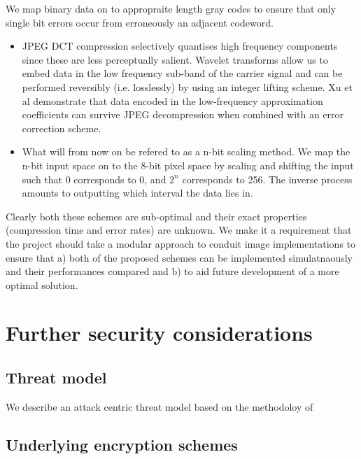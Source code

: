 We map binary data on to appropraite length gray codes to ensure that only single bit errors occur from erroneously an adjacent codeword.

\begin{itemize}

    \item JPEG DCT compression selectively quantises high frequency components since these are less perceptually salient. Wavelet transforms allow us to embed data in the low frequency sub-band of the carrier signal and can be performed reversibly (i.e. losslessly) by using an integer lifting scheme. Xu et al demonstrate that \cite{haar} data encoded in the low-frequency approximation coefficients can survive JPEG decompression when combined with an error correction scheme.
    
    \item What will from now on be refered to as a n-bit scaling method. We map the n-bit input space on to the 8-bit pixel space by scaling and shifting the input such that 0 corresponds to 0, and $2^n$ corresponds to 256. The inverse process amounts to outputting which interval the data lies in.

\end{itemize}

Clearly both these schemes are sub-optimal and their exact properties (compression time and error rates) are unknown. We make it a requirement that the project should take a modular approach to conduit image implementations to ensure that a) both of the proposed schemes can be implemented simulatnaously and their performances compared and b) to aid future development of a more optimal solution.



\FloatBarrier 
\section{Further security considerations}


\FloatBarrier
\subsection{Threat model}

We describe an attack centric threat model based on the methodoloy of \cite{XXX}



\FloatBarrier
\subsection{Underlying encryption schemes}

